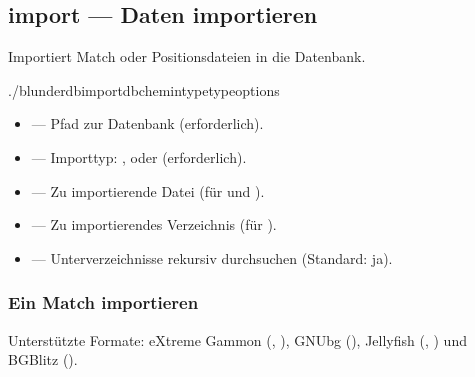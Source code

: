 \documentclass[letterpaper,10pt,german]{sphinxmanual}
\begin{document}
\subsection{import — Daten importieren}
\label{\detokenize{cli:import-importer-des-donnees}}
\sphinxAtStartPar
Importiert Match\sphinxhyphen{} oder Positionsdateien in die Datenbank.

\begin{sphinxVerbatim}[commandchars=\\\{\}]
./blunderdbimport\PYGZhy{}\PYGZhy{}db\PYGZlt{}chemin\PYGZgt{}\PYGZhy{}\PYGZhy{}type\PYGZlt{}type\PYGZgt{}\PYG{o}{[}options\PYG{o}{]}
\end{sphinxVerbatim}

\sphinxAtStartPar
{}
\begin{itemize}
\item {} 
\sphinxAtStartPar
{} — Pfad zur Datenbank (erforderlich).

\item {} 
\sphinxAtStartPar
{} — Importtyp: ,  oder  (erforderlich).

\item {} 
\sphinxAtStartPar
{} — Zu importierende Datei (für  und ).

\item {} 
\sphinxAtStartPar
{} — Zu importierendes Verzeichnis (für ).

\item {} 
\sphinxAtStartPar
{} — Unterverzeichnisse rekursiv durchsuchen (Standard: ja).

\end{itemize}


\subsubsection{Ein Match importieren}
\label{\detokenize{cli:import-d-un-match}}
\sphinxAtStartPar
Unterstützte Formate: eXtreme Gammon (, ), GNUbg (), Jellyfish (, ) und BGBlitz ().
\end{document}
